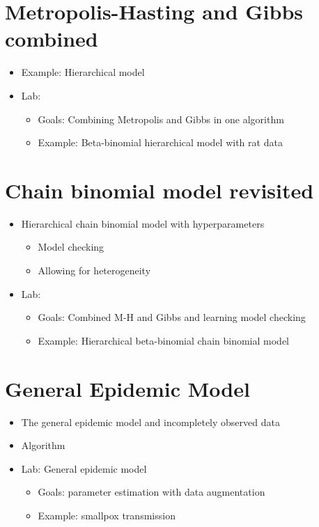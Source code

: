 \documentclass[11pt]{article}
\begin{document}
\section{Metropolis-Hasting and Gibbs combined} 
\begin{itemize}
\item Example: Hierarchical model
\item Lab:
\begin{itemize}
\item Goals: Combining Metropolis and Gibbs in one algorithm
\item Example: Beta-binomial hierarchical model with rat data
\end{itemize}
\end{itemize}

\section{Chain binomial model revisited} 
\begin{itemize} 
\item Hierarchical chain binomial model with hyperparameters
\begin{itemize}
\item  Model checking 
\item Allowing for heterogeneity
\end{itemize}
\item Lab: 
\begin{itemize}
\item Goals: Combined M-H and Gibbs and learning model checking
\item   Example: Hierarchical beta-binomial chain binomial model
\end{itemize}
\end{itemize}


\section{General Epidemic Model}
\begin{itemize}
\item The general epidemic model and incompletely observed data 
\item Algorithm
\item {Lab: General epidemic model}
\begin{itemize}
\item  Goals: parameter estimation with data augmentation
\item Example: smallpox transmission
\end{itemize}
\end{itemize}
\end{document}
